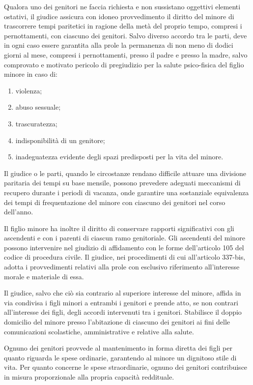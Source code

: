 \documentclass[twocolumn,12pt]{article}
\begin{document}
Qualora uno dei genitori ne faccia richiesta e non sussistano oggettivi elementi ostativi, il giudice assicura con idoneo provvedimento il diritto del minore di trascorrere tempi paritetici in ragione della metà del proprio tempo, compresi i pernottamenti, con ciascuno dei genitori. Salvo diverso accordo tra le parti, deve in ogni caso essere garantita alla prole la permanenza di non meno di dodici giorni al mese, compresi i pernottamenti, presso il padre e presso la madre, salvo comprovato e motivato pericolo di pregiudizio per la salute psico-fisica del figlio minore in caso di:
\begin{enumerate}[topsep=0pt,itemsep=-1ex,partopsep=1ex,parsep=1ex]
\item violenza;
\item abuso sessuale;
\item trascuratezza;
\item indisponibilità di un genitore;
\item inadeguatezza evidente degli spazi predisposti per la vita del minore.
\end{enumerate}
\bigbreak
\indent Il giudice o le parti, quando le circostanze rendano difficile attuare una divisione paritaria dei tempi su base mensile, possono
prevedere adeguati meccanismi di recupero durante i periodi di vacanza, onde garantire una sostanziale equivalenza dei tempi di frequentazione del minore con ciascuno dei genitori nel corso dell’anno.

Il figlio minore ha inoltre il diritto di conservare rapporti significativi con gli ascendenti e con i parenti di ciascun ramo genitoriale. Gli ascendenti del minore possono intervenire nel giudizio di affidamento con le forme dell’articolo 105 del codice di procedura civile. Il giudice, nei procedimenti di cui all’articolo 337-bis, adotta i provvedimenti relativi alla prole con esclusivo riferimento all’interesse morale e materiale di essa.

Il giudice, salvo che ciò sia contrario al superiore interesse del minore, affida in via condivisa i figli minori a entrambi i genitori e prende atto, se non contrari all’interesse dei figli, degli accordi intervenuti tra i genitori. Stabilisce il doppio domicilio del minore presso l’abitazione di ciascuno dei genitori ai fini delle comunicazioni scolastiche, amministrative e relative alla salute.

Ognuno dei genitori provvede al mantenimento in forma diretta dei figli per quanto riguarda le spese ordinarie, garantendo al minore
un dignitoso stile di vita. Per quanto concerne le spese straordinarie, ognuno dei genitori contribuisce in misura proporzionale alla propria
capacità reddituale.
\end{document}
